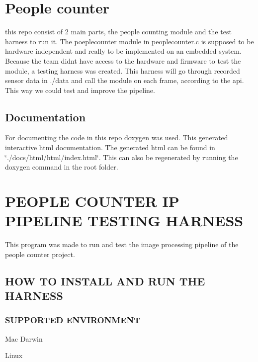 \section*{People counter}

this repo consist of 2 main parts, the people counting module and the test harness to run it. The poeplecounter module in peoplecounter.\+c is supposed to be hardware independent and really to be implemented on an embedded system. Because the team didn\textquotesingle{}t have access to the hardware and firmware to test the module, a testing harness was created. This harness will go through recorded sensor data in ./data and call the module on each frame, according to the api. This way we could test and improve the pipeline.

\subsection*{Documentation}

For documenting the code in this repo doxygen was used. This generated interactive html documentation. The generated html can be found in \char`\"{}./docs/html/html/index.\+html\char`\"{}. This can also be regenerated by running the doxygen command in the root folder.

\section*{P\+E\+O\+P\+LE C\+O\+U\+N\+T\+ER IP P\+I\+P\+E\+L\+I\+NE T\+E\+S\+T\+I\+NG H\+A\+R\+N\+E\+SS}

This program was made to run and test the image processing pipeline of the people counter project.

\subsection*{H\+OW TO I\+N\+S\+T\+A\+LL A\+ND R\+UN T\+HE H\+A\+R\+N\+E\+SS}

\subsubsection*{S\+U\+P\+P\+O\+R\+T\+ED E\+N\+V\+I\+R\+O\+N\+M\+E\+NT}


\begin{DoxyItemize}
\item Mac Darwin
\item Linux
\end{DoxyItemize}


